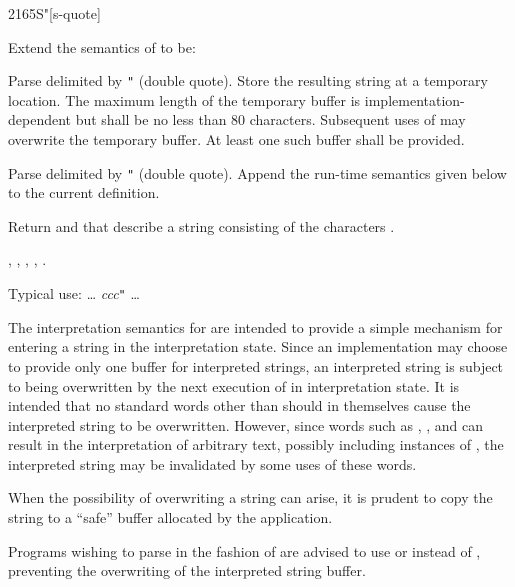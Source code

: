 \begin{worddef}[Sq]{2165}{S"}[s-quote]
\item Extend the semantics of  to be:

\interpret

	Parse  delimited by \texttt{"} (double quote). Store
	the resulting string  at a temporary location.
	The maximum length of the temporary buffer is
	implementation-dependent but shall be no less than 80 characters.
	Subsequent uses of  may overwrite the temporary buffer.
	At least one such buffer shall be provided.

\compile

	Parse  delimited by \texttt{"} (double quote). Append
	the run-time semantics given below to the current definition.

\runtime

	Return  and  that describe a string
	consisting of the characters .

\see {},
	,
	,
	,
	.

	\begin{rationale} %
		Typical use:
			{\ldots}  \emph{ccc}\texttt{"} {\ldots}

		The interpretation semantics for  are intended to
		provide a simple mechanism for entering a string in the
		interpretation state. Since an implementation may choose to
		provide only one buffer for interpreted strings, an
		interpreted string is subject to being overwritten by the
		next execution of  in interpretation state. It is
		intended that no standard words other than  should
		in themselves cause the interpreted string to be overwritten.
		However, since words such as ,
		,  and
		 can result in the interpretation of arbitrary
		text, possibly including instances of , the
		interpreted string may be invalidated by some uses of these
		words.

		When the possibility of overwriting a string can arise, it is
		prudent to copy the string to a ``safe'' buffer allocated by
		the application.

		Programs wishing to parse in the fashion of  are
		advised to use  or 
		 instead of , preventing the
		overwriting of the interpreted string buffer.
	\end{rationale}
\end{worddef}


